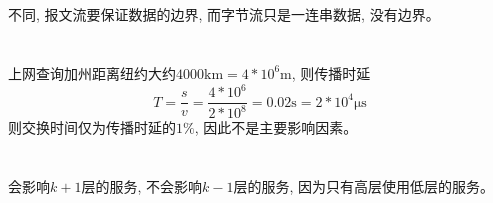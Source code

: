 \documentclass{zpt}
\begin{document}
\section{}
不同, 报文流要保证数据的边界, 而字节流只是一连串数据, 没有边界。

\section{}
上网查询加州距离纽约大约$4000\mathrm{km} = 4*10^{6}\mathrm{m}$, 则传播时延
\begin{equation}
    T = \frac{s}{v} = \frac{4*10^6}{2*10^8} = 0.02\mathrm{s} = 2*10^4 \mathrm{\mu s}
\end{equation}
则交换时间仅为传播时延的$1\%$, 因此不是主要影响因素。

\section{}
会影响$k+1$层的服务, 不会影响$k-1$层的服务, 因为只有高层使用低层的服务。
\end{document}

